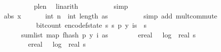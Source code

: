 \begin{isabellebody}
\ \ \ \ \ \ \ \ \isamarkupfalse%
\ p{\isacharunderscore}{\kern0pt}le{\isacharunderscore}{\kern0pt}n\ \isamarkupfalse%
\ linarith\isanewline
\ \ \ \ \ \ \ \ \isamarkupfalse%
\ simp{\isacharplus}{\kern0pt}\isanewline
\ \ \ \ \ \ \isamarkupfalse%
\ \isamarkupfalse%
\ {\isachardoublequoteopen}abs\ x\ {\isasymle}\ \ {\isacharparenleft}{\kern0pt}{}\ {\isacharplus}{\kern0pt}\ {}\ {\isacharasterisk}{\kern0pt}\ int\ n{\isacharparenright}{\kern0pt}\ {\isacharasterisk}{\kern0pt}\ int\ {\isacharparenleft}{\kern0pt}length\ as{\isacharparenright}{\kern0pt}{\isachardoublequoteclose}\isanewline
\ \ \ \ \ \ \ \ \isamarkupfalse%
\ {\isacharparenleft}{\kern0pt}simp\ add{\isacharcolon}{\kern0pt}\ mult{\isachardot}{\kern0pt}commute{\isacharparenright}{\kern0pt}\isanewline
\ \ \ \ \isamarkupfalse%
\isanewline
\ \ \ \ \isanewline
\ \ \ \ \isamarkupfalse%
\ {\isachardoublequoteopen}bit{\isacharunderscore}{\kern0pt}count\ {\isacharparenleft}{\kern0pt}encode{\isacharunderscore}{\kern0pt}f{}{\isacharunderscore}{\kern0pt}state\ {\isacharparenleft}{\kern0pt}s\ s\ p{\isacharcomma}{\kern0pt}\ y{\isacharcomma}{\kern0pt}\ {\isasymlambda}i{\isasymin}{\isacharbraceleft}{\kern0pt}{}{\isachardot}{\kern0pt}{\isachardot}{\kern0pt}{\isacharless}{\kern0pt}s\ {\isasymtimes}\ {\isacharbraceleft}{\kern0pt}{}{\isachardot}{\kern0pt}{\isachardot}{\kern0pt}{\isacharless}{\kern0pt}s\isanewline
\ \ \ \ \ \ sum{\isacharunderscore}{\kern0pt}list\ {\isacharparenleft}{\kern0pt}map\ {\isacharparenleft}{\kern0pt}f{}{\isacharunderscore}{\kern0pt}hash\ p\ {\isacharparenleft}{\kern0pt}y\ i{\isacharparenright}{\kern0pt}{\isacharparenright}{\kern0pt}\ as{\isacharparenright}{\kern0pt}{\isacharparenright}{\kern0pt}{\isacharparenright}{\kern0pt}\isanewline
\ \ \ \ \ \ \ {\isasymle}\ ereal\ {\isacharparenleft}{\kern0pt}{}\ {\isacharasterisk}{\kern0pt}\ {\isacharparenleft}{\kern0pt}log\ {}\ {\isacharparenleft}{\kern0pt}real\ s\ {\isacharplus}{\kern0pt}\ {}{\isacharparenright}{\kern0pt}{\isacharparenright}{\kern0pt}\ {\isacharplus}{\kern0pt}\ {}{\isacharparenright}{\kern0pt}\ \isanewline
\ \ \ \ \ \ \ {\isacharplus}{\kern0pt}\ {\isacharparenleft}{\kern0pt}ereal\ {\isacharparenleft}{\kern0pt}{}\ {\isacharasterisk}{\kern0pt}\ {\isacharparenleft}{\kern0pt}log\ {}\ {\isacharparenleft}{\kern0pt}real\ s\ {\isacharplus}{\kern0pt}\ {}{\isacharparenright}{\kern0pt}{\isacharparenright}{\kern0pt}\ {\isacharplus}{\kern0pt}\ {}{\isacharparenright}{\kern0pt}\isanewline

\end{isabellebody}
